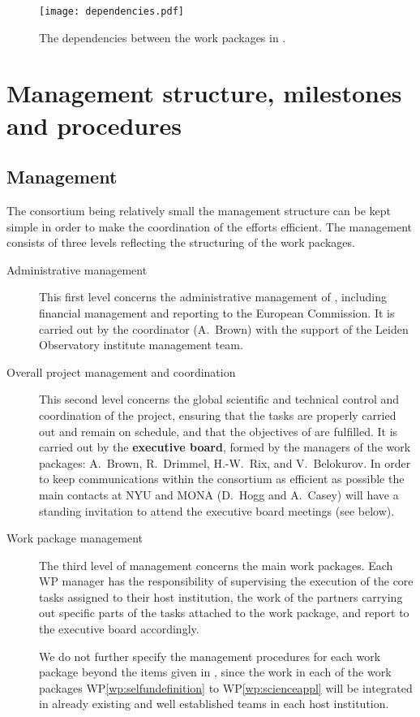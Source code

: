 \begin{figure}
    \centering
    \texttt{[image: dependencies.pdf]}
    \caption{The dependencies between the work packages in \acro.}
    \label{fig:dependencies}
\end{figure}

\section{Management structure, milestones and procedures}
\label{sec:management}

\subsection{Management}
\label{sec:mgtdetails}

The {\acro} consortium being relatively small the management structure can be kept simple in order to make the coordination of the efforts efficient. The management consists of three levels reflecting the structuring of the {\acro} work packages.
\begin{description}
    \item[Administrative management] This first level concerns the administrative management of {\acro}, including financial management and reporting to the European Commission. It is carried out by the {\acro} coordinator (A.~Brown) with the support of the Leiden Observatory institute management team.
    \item[Overall project management and coordination] This second level concerns the global scientific and technical control and coordination of the project, ensuring that the tasks are properly carried out and remain on schedule, and that the objectives of {\acro} are fulfilled. It is carried out by the \textbf{{\acro} executive board}, formed by the managers of the work packages: A.~Brown, R.~Drimmel, H.-W.~Rix, and V.~Belokurov. In order to keep communications within the consortium as efficient as possible the main contacts at NYU and MONA (D.~Hogg and A.~Casey) will have a standing invitation to attend the executive board meetings (see below).
    \item[Work package management] The third level of management concerns the main work packages. Each WP manager has the responsibility of supervising the execution of the core tasks assigned to their host institution, the work of the partners carrying out specific parts of the tasks attached to the work package, and report to the executive board accordingly.
    
    We do not further specify the management procedures for each work package beyond the items given in , since the work in each of the work packages WP\ref{wp:selfundefinition} to WP\ref{wp:scienceappl} will be integrated in already existing and well established teams in each host institution.
\end{description}

